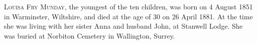 \textsc{Louisa Fry Munday}, the youngest of the ten children, was born on 4 August 1851 in Warminster, Wiltshire, and died at the age of 30 on 26 April 1881. At the time she was living with her sister Anna and husband John, at Stanwell Lodge. She was buried at Norbiton Cemetery in	Wallington, Surrey. 
